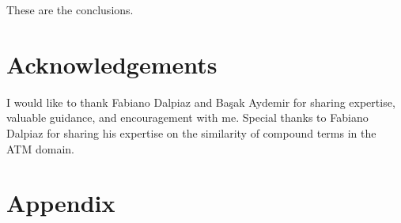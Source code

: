 \documentclass{article}
\begin{document}
These are the conclusions.

\section{Acknowledgements} \label{sec:ack}

I would like to thank Fabiano Dalpiaz and Ba\c sak Aydemir for sharing expertise, valuable guidance, and encouragement with me. Special thanks to Fabiano Dalpiaz for sharing his expertise on the similarity of compound terms in the ATM domain.

\printbibliography

\section{Appendix}
\end{document}
